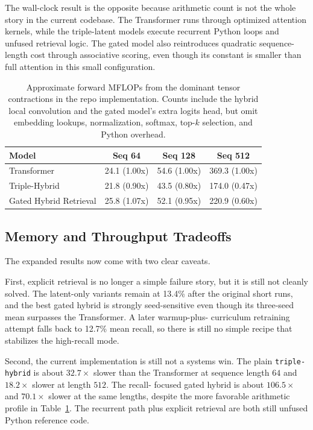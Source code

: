\documentclass[11pt]{article}
\begin{document}
The wall-clock result is the opposite because arithmetic count is not the whole
story in the current codebase. The Transformer runs through optimized attention
kernels, while the triple-latent models execute recurrent Python loops and
unfused retrieval logic. The gated model also reintroduces quadratic
sequence-length cost through associative scoring, even though its constant is
smaller than full attention in this small configuration.

\begin{table}[t]
\centering
\small
\begin{tabular}{lccc}
\toprule
Model & Seq 64 & Seq 128 & Seq 512 \\
\midrule
Transformer & 24.1 (1.00x) & 54.6 (1.00x) & 369.3 (1.00x) \\
Triple-Hybrid & 21.8 (0.90x) & 43.5 (0.80x) & 174.0 (0.47x) \\
Gated Hybrid Retrieval & 25.8 (1.07x) & 52.1 (0.95x) & 220.9 (0.60x) \\
\bottomrule
\end{tabular}
\caption{Approximate forward MFLOPs from the dominant tensor contractions in
the repo implementation. Counts include the hybrid local convolution and the
gated model's extra logits head, but omit embedding lookups, normalization,
softmax, top-$k$ selection, and Python overhead.}
\label{tab:compute}
\end{table}

\subsection{Memory and Throughput Tradeoffs}
The expanded results now come with two clear caveats.

First, explicit retrieval is no longer a simple failure story, but it is still
not cleanly solved. The latent-only variants remain at 13.4\% after the
original short runs, and the best gated hybrid is strongly seed-sensitive even
though its three-seed mean surpasses the Transformer. A later warmup-plus-
curriculum retraining attempt falls back to 12.7\% mean recall, so there is
still no simple recipe that stabilizes the high-recall mode.

Second, the current implementation is still not a systems win. The plain
\texttt{triple-hybrid} is about $32.7\times$ slower than the Transformer at
sequence length $64$ and $18.2\times$ slower at length $512$. The recall-
focused gated hybrid is about $106.5\times$ and $70.1\times$ slower at the
same lengths, despite the more favorable arithmetic profile in
Table~\ref{tab:compute}. The recurrent path plus explicit retrieval are both
still unfused Python reference code.
\end{document}
